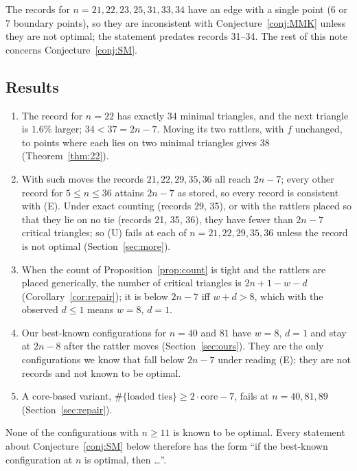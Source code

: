 \documentclass[11pt]{amsart}
\theoremstyle{definition}
\newcommand{\core}{\mathrm{core}}
\begin{document}
The records for $n = 21, 22, 23, 25, 31, 33, 34$ have an edge with a single point (6 or 7 boundary points), so they are inconsistent with Conjecture~\ref{conj:MMK} unless they are not optimal; the statement predates records 31--34. %
The rest of this note concerns Conjecture~\ref{conj:SM}.

\subsection*{Results}
\begin{enumerate}[label=(\arabic*)]
\item The record for $n = 22$ has exactly 34 minimal triangles, and the next triangle is $1.6\%$ larger; $34 < 37 = 2n-7$. Moving its two rattlers, with $f$ unchanged, to points where each lies on two minimal triangles gives 38 (Theorem~\ref{thm:22}).
\item With such moves the records $21, 22, 29, 35, 36$ all reach $2n-7$; every other record for $5 \le n \le 36$ attains $2n-7$ as stored, so every record is consistent with (E). Under exact counting (records 29, 35), or with the rattlers placed so that they lie on no tie (records 21, 35, 36), they have fewer than $2n-7$ critical triangles; so (U) fails at each of $n = 21, 22, 29, 35, 36$ unless the record is not optimal (Section~\ref{sec:more}).
\item When the count of Proposition~\ref{prop:count} is tight and the rattlers are placed generically, the number of critical triangles is $2n + 1 - w - d$ (Corollary~\ref{cor:repair}); it is below $2n-7$ iff $w + d > 8$, which with the observed $d \le 1$ means $w = 8$, $d = 1$.
\item Our best-known configurations for $n = 40$ and $81$ have $w = 8$, $d = 1$ and stay at $2n-8$ after the rattler moves (Section~\ref{sec:ours}). They are the only configurations we know that fall below $2n-7$ under reading (E); they are not records and not known to be optimal.
\item A core-based variant, $\#\{\text{loaded ties}\} \ge 2\cdot\core-7$, fails at $n = 40, 81, 89$ (Section~\ref{sec:repair}).
\end{enumerate}
None of the configurations with $n \ge 11$ is known to be optimal. Every statement about Conjecture~\ref{conj:SM} below therefore has the form ``if the best-known configuration at $n$ is optimal, then \dots''.
\end{document}
